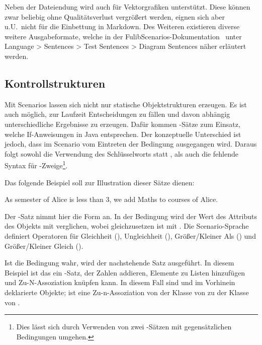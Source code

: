 Neben der Dateiendung  wird auch  für Vektorgrafiken unterstützt.
Diese können zwar beliebig ohne Qualitätsverlust vergrößert werden, eignen sich aber u.U.\ nicht für die Einbettung in Markdown.
Des Weiteren existieren diverse weitere Ausgabeformate, welche in der FulibScenarios-Dokumentation~\cite{documentation} unter Language > Sentences > Test Sentences > Diagram Sentences näher erläutert werden.

\subsection{Kontrollstrukturen}\label{subsec:control-structures}

Mit Scenarios lassen sich nicht nur statische Objektstrukturen erzeugen.
Es ist auch möglich, zur Laufzeit Entscheidungen zu fällen und davon abhängig unterschiedliche Ergebnisse zu erzeugen.
Dafür kommen -Sätze zum Einsatz, welche If-Anweisungen in Java entsprechen.
Der konzeptuelle Unterschied ist jedoch, dass im Scenario vom Eintreten der Bedingung ausgegangen wird.
Daraus folgt sowohl die Verwendung des Schlüsselworts  statt ,
als auch die fehlende Syntax für -Zweige\footnote{
Dies lässt sich durch Verwenden von zwei -Sätzen mit gegensätzlichen Bedingungen umgehen.
}.

Das folgende Beispiel soll zur Illustration dieser Sätze dienen:

\begin{codeblock}
    As semester of Alice is less than 3, we add Maths to courses of Alice.
\end{codeblock}

Der -Satz nimmt hier die Form  an.
In der Bedingung wird der Wert des Attributs  des Objekts  mit  verglichen, wobei  gleichzusetzen ist mit \code{<}.
Die Scenario-Sprache definiert Operatoren für Gleichheit (), Ungleichheit (), Größer/Kleiner Als () und Größer/Kleiner Gleich ().

Ist die Bedingung wahr, wird der nachstehende Satz ausgeführt.
In diesem Beispiel ist das ein -Satz, der Zahlen addieren, Elemente zu Listen hinzufügen und Zu-N-Assoziation knüpfen kann.
In diesem Fall sind  und  im Vorhinein deklarierte Objekte;
 ist eine Zu-n-Assoziation von der Klasse von  zu der Klasse von .

